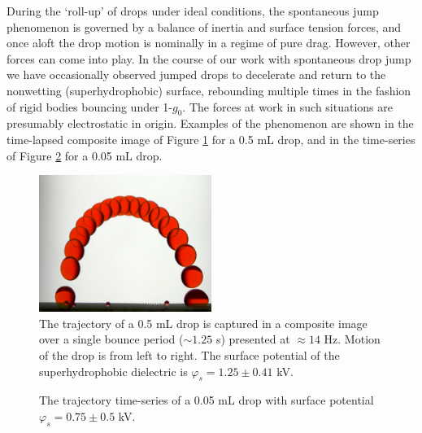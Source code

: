 \documentclass[aip,reprint, floatfix]{revtex4-1}
\begin{document}
During the `roll-up' of drops under ideal conditions, the spontaneous jump phenomenon is governed by a balance of inertia and surface tension forces, and once aloft the drop motion is nominally in a regime of pure drag. However, other forces can come into play. In the course of our work with spontaneous drop jump we have occasionally observed jumped drops to decelerate and return to the nonwetting (superhydrophobic) surface, rebounding multiple times in the fashion of rigid bodies bouncing under 1-$g_0$. The forces at work in such situations are presumably electrostatic in origin. Examples of the phenomenon are shown in the time-lapsed composite image of Figure \ref{fig:bounce} for a 0.5 mL drop, and in the time-series of Figure \ref{fig:bounce_time} for a 0.05 mL drop.
\begin{figure}[htb]
\centering
\includegraphics[width=0.5\textwidth]{bounce.png}
\caption{The trajectory of a 0.5 mL drop is captured in a composite image over a single bounce period ($\sim 1.25$ s) presented at $\approx 14$ Hz. Motion of the drop is from left to right. The surface potential of the superhydrophobic dielectric is $\varphi_s = 1.25 \pm 0.41$ kV. \label{fig:bounce}}
\end{figure}

\begin{figure}[htb]
\centering
\resizebox{0.5\textwidth}{!}{}
\caption{The trajectory time-series of a 0.05 mL drop with surface potential $\varphi_s = 0.75 \pm 0.5$ kV. \label{fig:bounce_time}}
\end{figure}
\end{document}
